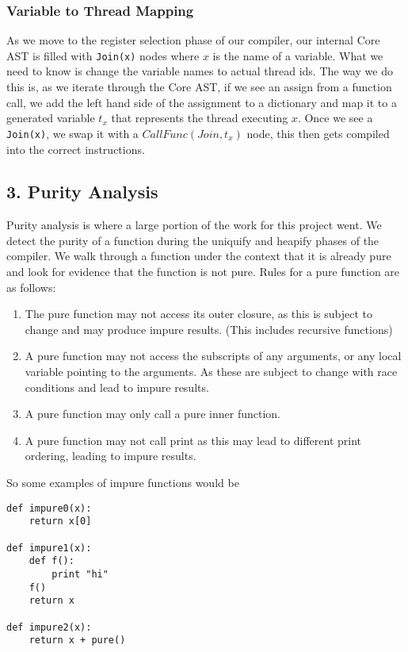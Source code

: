 \documentclass{acm_proc_article-sp}
\begin{document}
\subsubsection*{Variable to Thread Mapping}

As we move to the register selection phase of our compiler, our internal Core
AST is filled with \verb|Join(x)| nodes where $x$ is the name of a variable.
What we need to know is change the variable names to actual thread ids. The way
we do this is, as we iterate through the Core AST, if we see an assign from a
function call, we add the left hand side of the assignment to a dictionary and
map it to a generated variable $t_x$ that represents the thread executing $x$.
Once we see a \verb|Join(x)|, we swap it with a $CallFunc(Join, t_x)$ node,
this then gets compiled into the correct instructions.


\subsection*{3. Purity Analysis}

Purity analysis is where a large portion of the work for this project went. We
detect the purity of a function during the uniquify and heapify phases of the
compiler. We walk through a function under the context that it is already pure
and look for evidence that the function is not pure. Rules for a pure function
are as follows:

\begin{enumerate} 

\item The pure function may not access its outer closure, as
this is subject to change and may produce impure results. (This includes
recursive functions) \item A pure function may not access the subscripts of any
arguments, or any local variable pointing to the arguments. As these are
subject to change with race conditions and lead to impure results.  \item A
pure function may only call a pure inner function.  \item A pure function may
not call print as this may lead to different print ordering, leading to impure
results.  \end{enumerate}

So some examples of impure functions would be 

\begin{verbatim}
def impure0(x):
    return x[0]

def impure1(x):
    def f():
        print "hi"
    f()
    return x

def impure2(x):
    return x + pure()
\end{verbatim}
\end{document}
